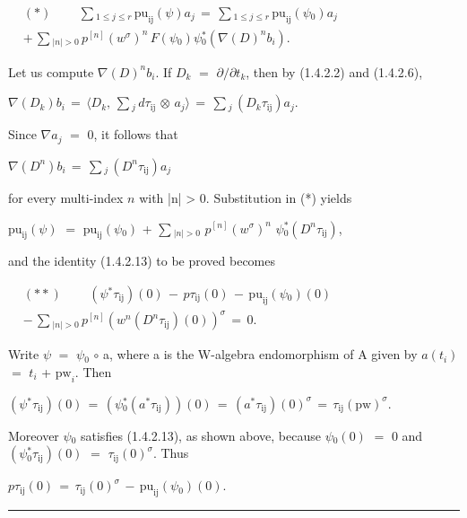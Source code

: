 \documentclass[9pt]{article}
\newcommand{\CanonText}[1]{\par{\fontsize{8.0}{9.35}\selectfont\RaggedRight #1\par}\vspace{2.2pt}}
\newcommand{\CanonDisplay}[1]{\par\vspace{1.2pt}\begin{center}{\fontsize{7.2}{8.4}\selectfont\(\displaystyle #1\)}\end{center}\vspace{1.2pt}}
\newenvironment{CanonMathBlock}{\par\vspace{1.2pt}\begin{center}\fontsize{6.8}{8.0}\selectfont\(\displaystyle}{\)\end{center}\vspace{1.2pt}}
\begin{document}
\begin{minipage}[t][\dimexpr\textheight-5pt\relax][t]{\textwidth}
\begin{CanonMathBlock}
\begin{aligned}
& (*)\qquad\,\sum{}_{1\leq{}j\leq{}r}\,\text{pu}_{\mathrm{ij}}(\psi{})a_{j}\,=\,\sum{}_{1\leq{}j\leq{}r}\,\text{pu}_{\mathrm{ij}}(\psi{}_{0})a_{j}\\
& +\,\sum{}_{|n|>0}\,p^{[n]}(w^\sigma{})^{n}\,F(\psi{}_{0})\psi{}_{0}^{*}(\nabla{}(D)^{n}b_{i}).
\end{aligned}
\end{CanonMathBlock}
\CanonText{Let us compute \(\nabla{}(D)^{n}b_{i}\). If \(D_{k}\) \(=\) \(\partial{}/\partial{}t_{k}\), then by (1.4.2.2) and (1.4.2.6),}
\CanonDisplay{\nabla{}(D_{k})b_{i}\,=\,\langle{}D_{k},\,\sum{}_{j}\,d\tau{}_{\mathrm{ij}}\,\otimes{}\,a_{j}\rangle{}\,=\,\sum{}_{j}\,(D_{k}\tau{}_{\mathrm{ij}})a_{j}.}
\CanonText{Since \(\nabla{}a_{j}\) \(=\) 0, it follows that}
\CanonDisplay{\nabla{}(D^{n})b_{i}\,=\,\sum{}_{j}\,(D^{n}\tau{}_{\mathrm{ij}})a_{j}}
\CanonText{for every multi-index \(n\) with |n| > 0. Substitution in (*) yields}
\CanonText{\(\text{pu}_{\mathrm{ij}}(\psi{})\) \(=\) \(\text{pu}_{\mathrm{ij}}(\psi{}_{0})\) + \(\sum{}_{|n|>0}\) \(p^{[n]}(w^\sigma{})^{n}\) \(\psi{}_{0}^{*}(D^{n}\tau{}_{\mathrm{ij}})\),}
\CanonText{and the identity (1.4.2.13) to be proved becomes}
\begin{CanonMathBlock}
\begin{aligned}
& (**)\qquad\,(\psi{}^{*}\tau{}_{\mathrm{ij}})(0)\,-\,p\tau{}_{\mathrm{ij}}(0)\,-\,\text{pu}_{\mathrm{ij}}(\psi{}_{0})(0)\\
& -\,\sum{}_{|n|>0}\,p^{[n]}(w^{n}(D^{n}\tau{}_{\mathrm{ij}})(0))^\sigma{}\,=\,0.
\end{aligned}
\end{CanonMathBlock}
\CanonText{Write \(\psi{}\) \(=\) \(\psi{}_{0}\) \(\circ{}\) a, where a is the W-algebra endomorphism of A given by \(a(t_{i})\) \(=\) \(t_{i}\) + \(\text{pw}_{i}\). Then}
\CanonDisplay{(\psi{}^{*}\tau{}_{\mathrm{ij}})(0)\,=\,(\psi{}_{0}^{*}(a^{*}\tau{}_{\mathrm{ij}}))(0)\,=\,(a^{*}\tau{}_{\mathrm{ij}})(0)^\sigma{}\,=\,\tau{}_{\mathrm{ij}}(\text{pw})^\sigma{}.}
\CanonText{Moreover \(\psi{}_{0}\) satisfies (1.4.2.13), as shown above, because \(\psi{}_{0}(0)\) \(=\) 0 and \((\psi{}_{0}^{*}\tau{}_{\mathrm{ij}})(0)\) \(=\) \(\tau{}_{\mathrm{ij}}(0)^\sigma{}\). Thus}
\CanonDisplay{p\tau{}_{\mathrm{ij}}(0)\,=\,\tau{}_{\mathrm{ij}}(0)^\sigma{}\,-\,\text{pu}_{\mathrm{ij}}(\psi{}_{0})(0).}
\vfill
{\color{Accent}\hrule height 0.35pt}\vspace{3pt}
\end{minipage}
\end{document}
